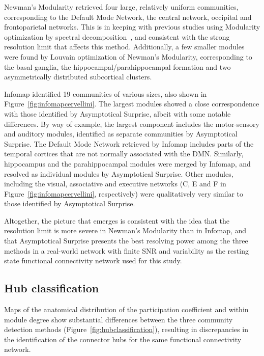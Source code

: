 Newman's Modularity retrieved four large, relatively uniform communities, corresponding to the Default Mode Network, the central network, occipital and frontoparietal networks.
This is in keeping with previous studies using Modularity optimization by spectral decomposition~\cite{crossley2013a}, and consistent with the strong resolution limit that affects this method.
Additionally, a few smaller modules were found by Louvain optimization of Newman's Modularity, corresponding to the basal ganglia, the hippocampal/parahippocampal formation and two asymmetrically distributed subcortical clusters.

Infomap identified 19 communities of various sizes, also shown in Figure~\ref{fig:infomapcervellini}.
The largest modules showed a close correspondence with those identified by Asymptotical Surprise, albeit with some notable differences.
By way of example, the largest component includes the motor-sensory and auditory modules, identified as separate communities by Asymptotical Surprise.
The Default Mode Network retrieved by Infomap includes parts of the temporal cortices that are not normally associated with the DMN.
Similarly, hippocampus and the parahippocampal modules were merged by Infomap, and resolved as individual modules by Asymptotical Surprise.
Other modules, including the visual, associative and executive networks (C, E and F in Figure~\ref{fig:infomapcervellini}, respectively) were qualitatively very similar to those identified by Asymptotical Surprise.

Altogether, the picture that emerges is consistent with the idea that the resolution limit is more severe in Newman's Modularity than in Infomap, and that Asymptotical Surprise presents the best resolving power among the three methods in a real-world network with finite SNR and variability as the resting state functional connectivity network used for this study.

\subsection{Hub classification}
Maps of the anatomical distribution of the participation coefficient and within module degree show substantial differences between the three community detection methods (Figure~\ref{fig:hubclassification}), resulting in discrepancies in the identification of the connector hubs for the same functional connectivity network.

